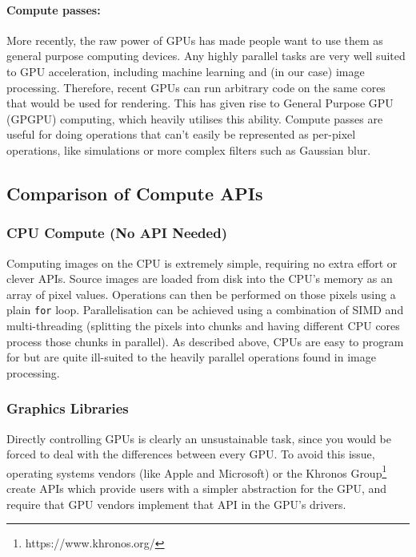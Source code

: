 \documentclass[12pt]{article}
\begin{document}
\paragraph{Compute passes:} More recently, the raw power of GPUs has made people want to use them as
general purpose computing devices.  Any highly parallel tasks are very well suited to GPU
acceleration, including machine learning and (in our case) image processing.  Therefore, recent GPUs
can run arbitrary code on the same cores that would be used for rendering.  This has given rise to
General Purpose GPU (GPGPU) computing, which heavily utilises this ability.  Compute passes are
useful for doing operations that can't easily be represented as per-pixel operations, like
simulations or more complex filters such as Gaussian blur.

\subsection{Comparison of Compute APIs}

\subsubsection{CPU Compute (No API Needed)}

Computing images on the CPU is extremely simple, requiring no extra effort or clever APIs.  Source
images are loaded from disk into the CPU's memory as an array of pixel values.  Operations can then
be performed on those pixels using a plain \verb|for| loop.  Parallelisation can be achieved
using a combination of SIMD and multi-threading (splitting the pixels into chunks and having
different CPU cores process those chunks in parallel).  As described above, CPUs are easy to program
for but are quite ill-suited to the heavily parallel operations found in image processing.

\subsubsection{Graphics Libraries}

Directly controlling GPUs is clearly an unsustainable task, since you would be forced to deal with
the differences between every GPU.  To avoid this issue, operating systems vendors (like Apple and
Microsoft) or the Khronos Group\footnote{https://www.khronos.org/} create APIs which provide users
with a simpler abstraction for the GPU, and require that GPU vendors implement that API in the GPU's
drivers.
\end{document}
